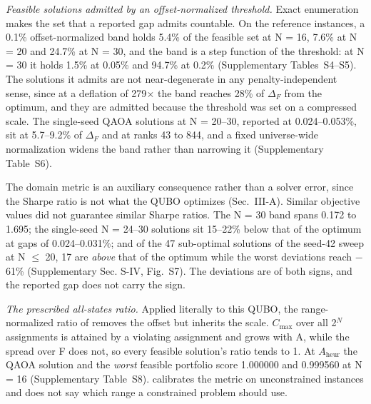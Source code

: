 \documentclass[journal]{IEEEtran}
\begin{document}
\textit{Feasible solutions admitted by an offset-normalized threshold.} Exact enumeration makes the set that a reported gap admits countable. On the reference instances, a 0.1\% offset-normalized band holds 5.4\% of the feasible set at N = 16, 7.6\% at N = 20 and 24.7\% at N = 30, and the band is a step function of the threshold: at N = 30 it holds 1.5\% at 0.05\% and 94.7\% at 0.2\% (Supplementary Tables~S4--S5). The solutions it admits are not near-degenerate in any penalty-independent sense, since at a deflation of 279$\times$ the band reaches 28\% of $\Delta_{F}$ from the optimum, and they are admitted because the threshold was set on a compressed scale. The single-seed QAOA solutions at N = 20--30, reported at 0.024--0.053\%, sit at 5.7--9.2\% of $\Delta_{F}$ and at ranks 43 to 844, and a fixed universe-wide normalization widens the band rather than narrowing it (Supplementary Table~S6).


The domain metric is an auxiliary consequence rather than a solver error, since the Sharpe ratio is not what the QUBO optimizes (Sec.~III-A). Similar objective values did not guarantee similar Sharpe ratios. The N = 30 band spans 0.172 to 1.695; the single-seed N = 24--30 solutions sit 15--22\% below that of the optimum at gaps of 0.024--0.031\%; and of the 47 sub-optimal solutions of the seed-42 sweep at N $\leq$ 20, 17 are \textit{above} that of the optimum while the worst deviations reach $-$61\% (Supplementary Sec. S-IV, Fig.~S7). The deviations are of both signs, and the reported gap does not carry the sign.


\textit{The prescribed all-states ratio.} Applied literally to this QUBO, the range-normalized ratio of \cite{ref22} removes the offset but inherits the scale. $C_{\mathrm{max}}$ over all 2$^{N}$ assignments is attained by a violating assignment and grows with A, while the spread over F does not, so every feasible solution's ratio tends to 1. At $A_{\mathrm{heur}}$ the QAOA solution and the \textit{worst} feasible portfolio score 1.000000 and 0.999560 at N = 16 (Supplementary Table~S8). \cite{ref22} calibrates the metric on unconstrained instances and does not say which range a constrained problem should use.
\end{document}

